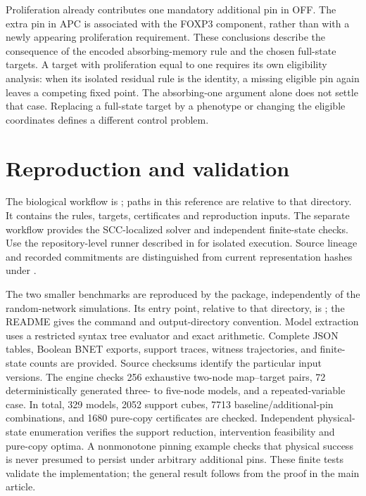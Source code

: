 Proliferation already contributes one mandatory additional pin in OFF.
The extra pin in APC is associated with the FOXP3 component, rather than
with a newly appearing proliferation requirement. These conclusions
describe the consequence of the encoded absorbing-memory rule and the
chosen full-state targets. A target with proliferation equal to one
requires its own eligibility analysis: when its isolated residual rule is
the identity, a missing eligible pin again leaves a competing fixed point.
The absorbing-one argument alone does not settle that case. Replacing a
full-state target by a phenotype or changing the eligible coordinates
defines a different control problem.


\section{Reproduction and validation}
\label{bio:reproduction}
The biological workflow is ; paths in this
reference are relative to that directory. It contains the rules, targets,
certificates and reproduction inputs. The separate 
workflow provides the SCC-localized solver and independent finite-state checks.
Use the repository-level runner described in  for
isolated execution. Source lineage and recorded commitments are distinguished
from current representation hashes under .


The two smaller benchmarks are reproduced by the 
package, independently of the random-network simulations. Its entry
point, relative to that directory, is ; the README gives the command and
output-directory convention. Model extraction uses a restricted syntax
tree evaluator and exact arithmetic. Complete JSON tables, Boolean BNET
exports, support traces, witness trajectories, and finite-state counts
are provided. Source checksums identify the particular input versions.
The engine checks 256 exhaustive two-node map--target pairs, 72 deterministically generated three- to five-node models, and a repeated-variable case. In total, 329 models, 2052 support cubes, 7713 baseline/additional-pin combinations, and 1680 pure-copy certificates are checked. Independent physical-state enumeration verifies the support reduction, intervention feasibility and pure-copy optima. A nonmonotone pinning example checks that physical success is never presumed to persist under arbitrary additional pins. These finite tests validate the implementation; the general result follows from the proof in the main article.


